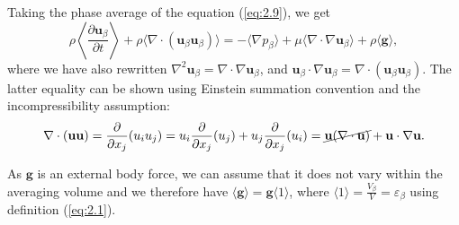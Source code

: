 \documentclass[a4paper, 11pt]{report}
\begin{document}
Taking the phase average of the equation (\ref{eq:2.9}), we get
\begin{equation}
	\rho\left\langle\frac{\partial\mathbf{u}_{\beta}}{\partial t}\right\rangle + \rho\langle\nabla\cdot(\mathbf{u}_{\beta}\mathbf{u}_{\beta})\rangle = -\langle\nabla p_{\beta}\rangle + \mu\langle\nabla\cdot\nabla\mathbf{u}_{\beta}\rangle +  \rho\langle\mathbf{g}\rangle, \label{eq:2.10} %
\end{equation}
where we have also rewritten $\nabla^2\mathbf{u}_{\beta}=\nabla\cdot\nabla\mathbf{u}_{\beta}$, and $\mathbf{u}_{\beta} \cdot \nabla \mathbf{u}_{\beta}=\nabla \cdot (\mathbf{u}_{\beta}\mathbf{u}_{\beta})$. The latter equality can be shown using Einstein summation convention and the incompressibility assumption:
\begin{equation}
    \nabla \cdot (\mathbf{u}\mathbf{u}) = \frac{\partial}{\partial x_j}(u_iu_j) = u_i\frac{\partial}{\partial x_j}(u_j) + u_j\frac{\partial}{\partial x_j}(u_i) = \cancel{\mathbf{u}(\nabla \cdot \mathbf{u})} + \mathbf{u} \cdot \nabla \mathbf{u}. \label{eq:2.11}
\end{equation}

As $\mathbf{g}$ is an external body force, we can assume that it does not vary within the averaging volume and we therefore have $\langle\mathbf{g}\rangle = \mathbf{g}\langle 1\rangle$, where $\langle 1\rangle = \frac{V_\beta}{V} = \varepsilon_\beta$ using definition (\ref{eq:2.1}).
\end{document}
